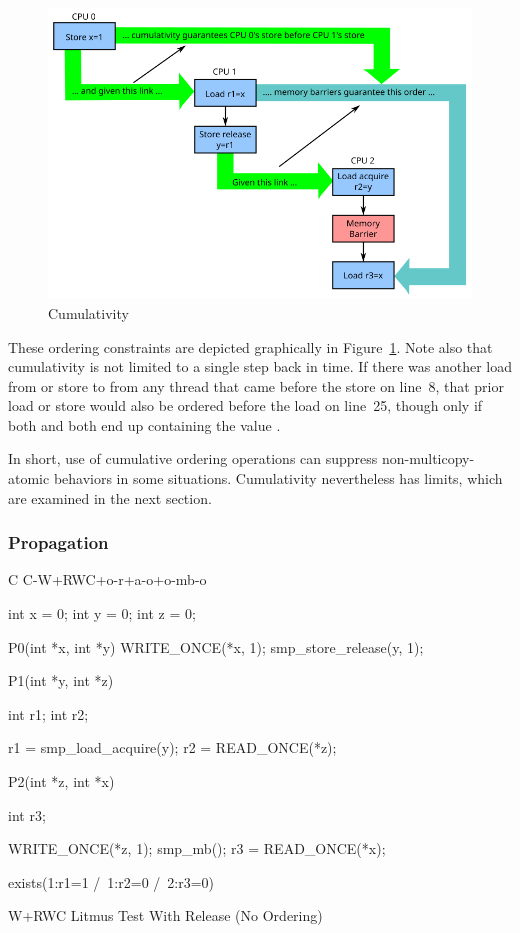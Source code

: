 \begin{figure}[htbp]
\centering
\includegraphics{memorder/memorybarriercum}
\caption{Cumulativity}
\label{fig:memorder:Cumulativity}
\end{figure}

These ordering constraints are depicted graphically in
Figure~\ref{fig:memorder:Cumulativity}.
Note also that cumulativity is not limited to a single step back in time.
If there was another load from  or store to  from any thread
that came before the store on line~8, that prior load or store would also
be ordered before the load on line~25, though only if both  and
 both end up containing the value .

In short, use of cumulative ordering operations can suppress
non-multicopy-atomic behaviors in some situations.
Cumulativity nevertheless has limits, which are examined in the next section.

\subsubsection{Propagation}
\label{sec:memorder:Propagation}

\begin{listing}[tbp]
{ \scriptsize
\begin{verbbox}[\LstLineNo]
C C-W+RWC+o-r+a-o+o-mb-o

{
int x = 0;
int y = 0;
int z = 0;
}

P0(int *x, int *y)
{
  WRITE_ONCE(*x, 1);
  smp_store_release(y, 1);
}

P1(int *y, int *z)
{
  int r1;
  int r2;

  r1 = smp_load_acquire(y);
  r2 = READ_ONCE(*z);
}

P2(int *z, int *x)
{
  int r3;

  WRITE_ONCE(*z, 1);
  smp_mb();
  r3 = READ_ONCE(*x);
}

exists(1:r1=1 /\ 1:r2=0 /\ 2:r3=0)
\end{verbbox}
}
\centering
\theverbbox
\caption{W+RWC Litmus Test With Release (No Ordering)}
\label{lst:memorder:W+RWC Litmus Test With Release (No Ordering)}
\end{listing}

